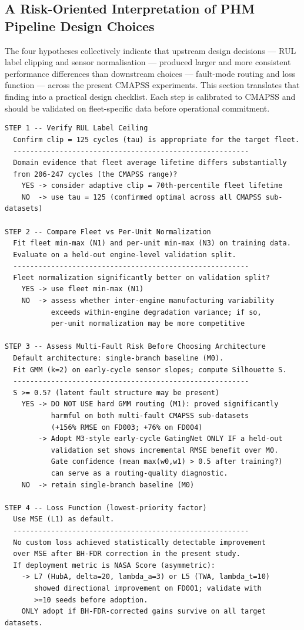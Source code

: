 \documentclass[review,12pt]{elsarticle}
\begin{document}
\subsection{A Risk-Oriented Interpretation of PHM Pipeline Design Choices}

The four hypotheses collectively indicate that upstream design decisions --- RUL label clipping and sensor normalisation --- produced larger and more consistent performance differences than downstream choices --- fault-mode routing and loss function --- across the present CMAPSS experiments. This section translates that finding into a practical design checklist. Each step is calibrated to CMAPSS and should be validated on fleet-specific data before operational commitment.
{\small\begin{verbatim}
STEP 1 -- Verify RUL Label Ceiling
  Confirm clip = 125 cycles (tau) is appropriate for the target fleet.
  --------------------------------------------------------
  Domain evidence that fleet average lifetime differs substantially
  from 206-247 cycles (the CMAPSS range)?
    YES -> consider adaptive clip = 70th-percentile fleet lifetime
    NO  -> use tau = 125 (confirmed optimal across all CMAPSS sub-datasets)

STEP 2 -- Compare Fleet vs Per-Unit Normalization
  Fit fleet min-max (N1) and per-unit min-max (N3) on training data.
  Evaluate on a held-out engine-level validation split.
  --------------------------------------------------------
  Fleet normalization significantly better on validation split?
    YES -> use fleet min-max (N1)
    NO  -> assess whether inter-engine manufacturing variability
           exceeds within-engine degradation variance; if so,
           per-unit normalization may be more competitive

STEP 3 -- Assess Multi-Fault Risk Before Choosing Architecture
  Default architecture: single-branch baseline (M0).
  Fit GMM (k=2) on early-cycle sensor slopes; compute Silhouette S.
  --------------------------------------------------------
  S >= 0.5? (latent fault structure may be present)
    YES -> DO NOT USE hard GMM routing (M1): proved significantly
           harmful on both multi-fault CMAPSS sub-datasets
           (+156% RMSE on FD003; +76% on FD004)
        -> Adopt M3-style early-cycle GatingNet ONLY IF a held-out
           validation set shows incremental RMSE benefit over M0.
           Gate confidence (mean max(w0,w1) > 0.5 after training?)
           can serve as a routing-quality diagnostic.
    NO  -> retain single-branch baseline (M0)

STEP 4 -- Loss Function (lowest-priority factor)
  Use MSE (L1) as default.
  --------------------------------------------------------
  No custom loss achieved statistically detectable improvement
  over MSE after BH-FDR correction in the present study.
  If deployment metric is NASA Score (asymmetric):
    -> L7 (HubA, delta=20, lambda_a=3) or L5 (TWA, lambda_t=10)
       showed directional improvement on FD001; validate with
       >=10 seeds before adoption.
    ONLY adopt if BH-FDR-corrected gains survive on all target datasets.
\end{verbatim}
}
\end{document}

